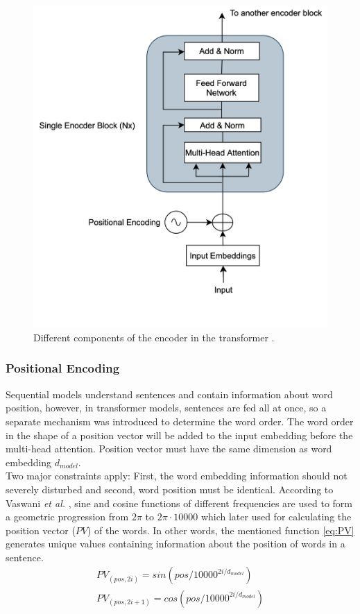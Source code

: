 \documentclass[%
	BCOR=8mm, %
	DIV=12,
	toc=bibliography, %
	toc=listof, %
	oneside, %
	egregdoesnotlikesansseriftitles, %
	]{scrbook}
\begin{document}
\begin{figure}[H]
\centering
\includegraphics[width=.50\textwidth]{img/EncoderArch.png}
\caption[Different components of an encoder in transformer]{Different components of the encoder in the transformer \cite{vaswani_attention_2017}.}
\label{diag:EncoderArch}
\end{figure}
\subsubsection{Positional Encoding}
Sequential models understand sentences and contain information about word position, however, in transformer models, sentences are fed all at once, so a separate mechanism was introduced to determine the word order. The word order in the shape of a position vector will be added to the input embedding before the multi-head attention. Position vector must have the same dimension as word embedding $d_{model}$.\\
Two major constraints apply: First, the word embedding information should not severely disturbed and second, word position must be identical. According to Vaswani \textit{et al.} \cite{vaswani_attention_2017}, sine and cosine functions of different frequencies are used to form a geometric progression from  $2\pi$ to $2\pi \cdot 10000$ which later used for calculating the position vector ($PV$) of the words. In other words, the mentioned function \ref{eq:PV} generates unique values containing information about the position of words in a sentence.
\begin{equation}
\begin{aligned}
    PV_{(pos,2i)}=sin(pos/10000^{2i/d_{model}})\\
    PV_{(pos,2i+1)}=cos(pos/10000^{2i/d_{model}})
    \label{eq:PV}
\end{aligned}
\end{equation}
\end{document}
